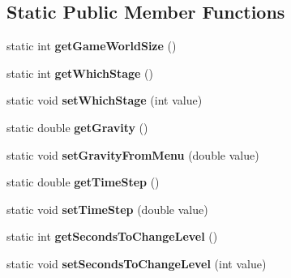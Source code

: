 \subsection*{Static Public Member Functions}
\begin{DoxyCompactItemize}
\item 
static int {\bfseries get\+Game\+World\+Size} ()\hypertarget{class_game_settings_a13a296542edec5e57341ecd745ffc76a}{}\label{class_game_settings_a13a296542edec5e57341ecd745ffc76a}

\item 
static int {\bfseries get\+Which\+Stage} ()\hypertarget{class_game_settings_a65ad06c2f10d238d7b819867cd261706}{}\label{class_game_settings_a65ad06c2f10d238d7b819867cd261706}

\item 
static void {\bfseries set\+Which\+Stage} (int value)\hypertarget{class_game_settings_a849a0d3853309c3e04c1d7cf805ff9af}{}\label{class_game_settings_a849a0d3853309c3e04c1d7cf805ff9af}

\item 
static double {\bfseries get\+Gravity} ()\hypertarget{class_game_settings_a1fb504bc0d2d6dc298b3ee0637f1abdb}{}\label{class_game_settings_a1fb504bc0d2d6dc298b3ee0637f1abdb}

\item 
static void {\bfseries set\+Gravity\+From\+Menu} (double value)\hypertarget{class_game_settings_a68c92b18de3f5641feacec5d658d5f21}{}\label{class_game_settings_a68c92b18de3f5641feacec5d658d5f21}

\item 
static double {\bfseries get\+Time\+Step} ()\hypertarget{class_game_settings_aadc1ccdee0b21d6183aea79c751a45de}{}\label{class_game_settings_aadc1ccdee0b21d6183aea79c751a45de}

\item 
static void {\bfseries set\+Time\+Step} (double value)\hypertarget{class_game_settings_a0a60452d1ea87fd29b4ff38ca38c8682}{}\label{class_game_settings_a0a60452d1ea87fd29b4ff38ca38c8682}

\item 
static int {\bfseries get\+Seconds\+To\+Change\+Level} ()\hypertarget{class_game_settings_a04b3974d7ad35eddff0c628c8e09e4cd}{}\label{class_game_settings_a04b3974d7ad35eddff0c628c8e09e4cd}

\item 
static void {\bfseries set\+Seconds\+To\+Change\+Level} (int value)\hypertarget{class_game_settings_a79a06cb8f4b51141575172fba4510c71}{}\label{class_game_settings_a79a06cb8f4b51141575172fba4510c71}


\end{DoxyCompactItemize}
